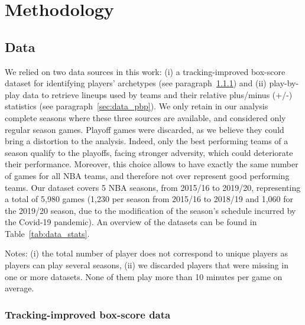 \section{Methodology}
\label{sec:method}

\subsection{Data}

We relied on two data sources in this work: (i) a tracking-improved box-score dataset for identifying players' archetypes (see paragraph~\ref{sec:data_trbs}) and (ii) play-by-play data to retrieve lineups used by teams and their relative plus/minus (+/-) statistics (see paragraph~\ref{sec:data_pbp}).
We only retain in our analysis complete seasons where these three sources are available, and considered only regular season games. 
Playoff games were discarded, as we believe they could bring a distortion to the analysis.
Indeed, only the best performing teams of a season qualify to the playoffs, facing stronger adversity, which could deteriorate their performance.
Moreover, this choice allows to have exactly the same number of games for all NBA teams, and therefore not over represent good performing teams.
Our dataset covers 5 NBA seasons, from 2015/16 to 2019/20, representing a total of 5,980 games (1,230 per season from 2015/16 to 2018/19 and 1,060 for the 2019/20 season, due to the modification of the season's schedule incurred by the Covid-19 pandemic).
An overview of the datasets can be found in Table~\ref{tab:data_stats}.

\begin{table}[htbp]
  \caption{Datasets overview}
  \centering
  \small
  \label{tab:data_stats}
   \newline
  {\raggedright \small * Notes: (i) the total number of player does not correspond to unique players as players can play several seasons, (ii) we discarded players that were missing in one or more datasets. None of them play more than 10 minutes per game on average.}
\end{table}

\subsubsection{Tracking-improved box-score data}
\label{sec:data_trbs}

